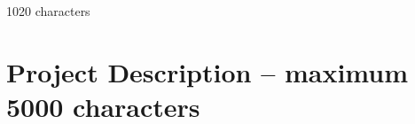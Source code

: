 \documentclass[11pt,  a4paper]{article}
\begin{document}
{\color{red} 1020 characters}\\



\section{Project Description -- maximum 5000 characters}

%	
%
\end{document}
